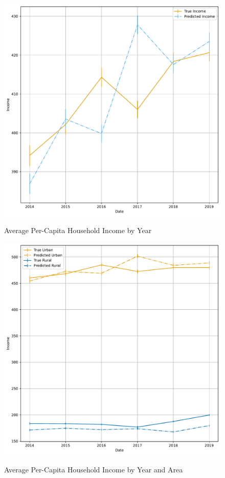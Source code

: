 \begin{figure}[H]
    \centering
    \caption{Average Per-Capita  Household Income by Year}
    \includegraphics[width=\textwidth]{../figures/fig5_average_income_time_series.pdf}
    \label{fig:enter-label}
\end{figure}



\begin{figure}[H]
    \centering
    \caption{Average Per-Capita  Household Income by Year and Area}
    \includegraphics[width=\textwidth]{../figures/fig6_average_income_time_series_by_area.pdf}
    \label{fig:enter-label}
\end{figure}


